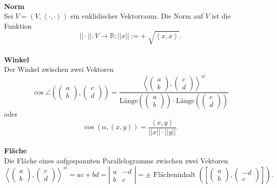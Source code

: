 \documentclass[a4paper,12pt]{article}
\begin{document}
\hfill\\\textbf{Norm}\\ 
Sei $V=\left(V,\left\langle \cdot ,\cdot \right\rangle \right)$ ein euklidischer Vektorraum. Die Norm auf $V$ ist die Funktion
\[ 
        ||\cdot ||:V\rightarrow \mathbb{R};||x||:=+\sqrt[]{\left\langle x,x\right\rangle }
.\] 
\hfill\\\textbf{Winkel}\\ 
Der Winkel zwischen zwei Vektoren
\[ 
        \cos \angle\left(\left(\begin{matrix}
                a\\b
        \end{matrix}\right),\left(\begin{matrix}
                c\\d
        \end{matrix}\right)\right)=\dfrac{\left\langle \left(\begin{matrix}
                a\\b
        \end{matrix}\right),\left(\begin{matrix}
                c\\d
        \end{matrix}\right)\right\rangle ^{s t}}{\text{Länge}\left(\left(\begin{matrix}
                a\\b
        \end{matrix}\right)\right)\cdot \text{Länge}\left(\left(\begin{matrix}
                c\\d
        \end{matrix}\right)\right)}
\] 
oder
\[ 
        \cos \left(\alpha ,\left(x,y\right)\right)=\dfrac{\left\langle x,y\right\rangle }{||x||\cdot ||y||}
.\] 
\hfill\\\textbf{Fläche}\\ 
Die Fläche eines aufgespannten Parallelogramms zwischen zwei Vektoren
\[ 
        \left\langle \left(\begin{matrix}
                a\\b
        \end{matrix}\right),\left(\begin{matrix}
                c\\d
        \end{matrix}\right)\right\rangle ^{s t}=ac+bd=\left|\begin{matrix}
        a&-d\\b&c
        \end{matrix}\right|=\pm\text{ Flächeninhalt } \left(\left[\left(\begin{matrix}
                a\\b
        \end{matrix}\right),\left(\begin{matrix}
                -d\\c
        \end{matrix}\right)\right]\right)
.\] 
\end{document}
